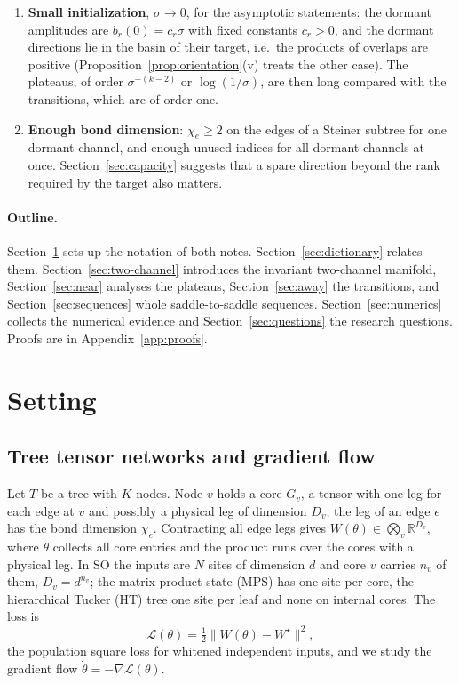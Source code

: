 \documentclass[11pt]{article}
\newcommand{\R}{\mathbb{R}}
\newcommand{\norm}[1]{\lVert #1\rVert}
\newcommand{\SO}{\textsf{SO}}
\theoremstyle{definition}
\numberwithin{equation}{section}
\begin{document}
\begin{enumerate}[label=\textbf{A\arabic*.},leftmargin=*,itemsep=3pt]
\item \textbf{Small initialization}, $\sigma\to0$, for the asymptotic statements: the dormant amplitudes are $b_r(0)=c_r\sigma$ with fixed constants $c_r>0$, and the dormant directions lie in the basin of their target, i.e.\ the products of overlaps are positive (Proposition~\ref{prop:orientation}(v) treats the other case). The plateaus, of order $\sigma^{-(k-2)}$ or $\log(1/\sigma)$, are then long compared with the transitions, which are of order one.
\item \textbf{Enough bond dimension}: $\chi_e\ge2$ on the edges of a Steiner subtree for one dormant channel, and enough unused indices for all dormant channels at once. Section~\ref{sec:capacity} suggests that a spare direction beyond the rank required by the target also matters.
\end{enumerate}

\paragraph{Outline.} Section~\ref{sec:setting} sets up the notation of both notes. Section~\ref{sec:dictionary} relates them. Section~\ref{sec:two-channel} introduces the invariant two-channel manifold, Section~\ref{sec:near} analyses the plateaus, Section~\ref{sec:away} the transitions, and Section~\ref{sec:sequences} whole saddle-to-saddle sequences. Section~\ref{sec:numerics} collects the numerical evidence and Section~\ref{sec:questions} the research questions. Proofs are in Appendix~\ref{app:proofs}.

\section{Setting}\label{sec:setting}

\subsection{Tree tensor networks and gradient flow}

Let $T$ be a tree with $K$ nodes. Node $v$ holds a core $G_v$, a tensor with one leg for each edge at $v$ and possibly a physical leg of dimension $D_v$; the leg of an edge $e$ has the bond dimension $\chi_e$. Contracting all edge legs gives $W(\theta)\in\bigotimes_v\R^{D_v}$, where $\theta$ collects all core entries and the product runs over the cores with a physical leg. In \SO{} the inputs are $N$ sites of dimension $d$ and core $v$ carries $n_v$ of them, $D_v=d^{n_v}$; the matrix product state (MPS) has one site per core, the hierarchical Tucker (HT) tree one site per leaf and none on internal cores. The loss is
\begin{equation}\label{eq:loss}
\mathcal L(\theta)=\tfrac12\norm{W(\theta)-W^\star}^2,
\end{equation}
the population square loss for whitened independent inputs, and we study the gradient flow $\dot\theta=-\nabla\mathcal L(\theta)$.
\end{document}
